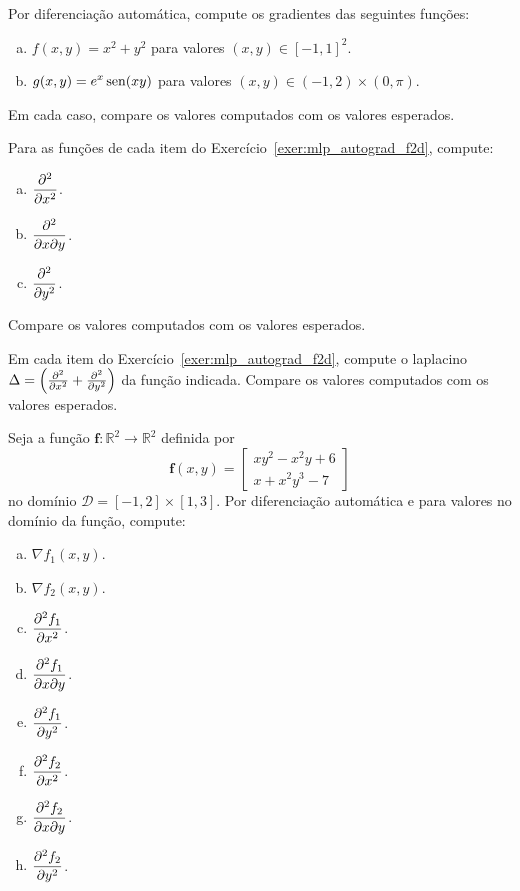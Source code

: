 \begin{exer}
  Por diferenciação automática, compute os gradientes das seguintes funções:
  \begin{enumerate}[a)]
  \item $\displaystyle f(x,y) = x^2 + y^2$ para valores $(x,y)\in [-1, 1]^2$.
  \item $\displaystyle g(x,y) = e^{x}\operatorname{sen}(xy)$ para valores $(x,y)\in (-1, 2)\times(0, \pi)$.
  \end{enumerate}
  Em cada caso, compare os valores computados com os valores esperados.  
\end{exer}

\begin{exer}\label{exer:mlp_autograd_f2d}
  Para as funções de cada item do Exercício~\ref{exer:mlp_autograd_f2d}, compute:
  \begin{enumerate}[a)]
  \item $\displaystyle\frac{\partial^2}{\partial x^2}$.
  \item $\displaystyle\frac{\partial^2}{\partial x\partial y}$.
  \item $\displaystyle\frac{\partial^2}{\partial y^2}$.
  \end{enumerate}
  Compare os valores computados com os valores esperados.
\end{exer}

\begin{exer}\label{exer:mlp_autograd_f2d}
  Em cada item do Exercício~\ref{exer:mlp_autograd_f2d}, compute o laplacino $\Delta = \left(\frac{\partial^2}{\partial x^2} + \frac{\partial^2}{\partial y^2}\right)$ da função indicada. Compare os valores computados com os valores esperados.
\end{exer}

\begin{exer}
  Seja a função $\pmb{f}:\mathbb{R}^2\to\mathbb{R}^2$ definida por
  \begin{equation}
    \pmb{f}(x,y) =
    \begin{bmatrix}
      xy^2 - x^2y + 6\\
      x + x^2y^3 - 7
    \end{bmatrix}
  \end{equation}
  no domínio $\mathcal{D} = [-1, 2]\times [1, 3]$.
  Por diferenciação automática e para valores no domínio da função, compute:
  \begin{enumerate}[a)]
  \item $\displaystyle\nabla f_1(x,y)$.
  \item $\displaystyle\nabla f_2(x,y)$.
  \item $\displaystyle\frac{\partial^2 f_1}{\partial x^2}$.
  \item $\displaystyle\frac{\partial^2 f_1}{\partial x\partial y}$.
  \item $\displaystyle\frac{\partial^2 f_1}{\partial y^2}$.
  \item $\displaystyle\frac{\partial^2 f_2}{\partial x^2}$.
  \item $\displaystyle\frac{\partial^2 f_2}{\partial x\partial y}$.
  \item $\displaystyle\frac{\partial^2 f_2}{\partial y^2}$.
  \end{enumerate}
\end{exer}
